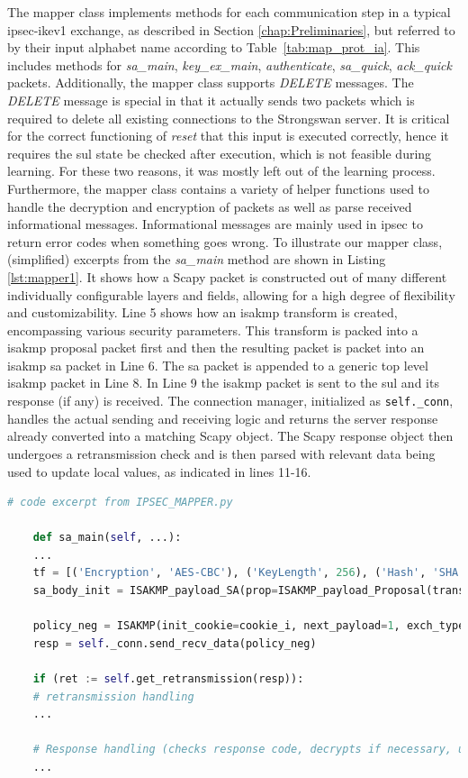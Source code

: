 The mapper class implements methods for each communication step in a typical \ac{ipsec}-\ac{ike}v1 exchange, as described in Section \ref{chap:Preliminaries}, but referred to by their input alphabet name according to Table~\ref{tab:map_prot_ia}. This includes methods for \emph{sa\_main}, \emph{key\_ex\_main}, \emph{authenticate}, \emph{sa\_quick}, \emph{ack\_quick} packets. Additionally, the mapper class supports \emph{DELETE} messages. The \emph{DELETE} message is special in that it actually sends two packets which is required to delete all existing connections to the Strongswan server. It is critical for the correct functioning of \emph{reset} that this input is executed correctly, hence it requires the \ac{sul} state be checked after execution, which is not feasible during learning. For these two reasons, it was mostly left out of the learning process. Furthermore, the mapper class contains a variety of helper functions used to handle the decryption and encryption of packets as well as parse received informational messages. Informational messages are mainly used in \ac{ipsec} to return error codes when something goes wrong. To illustrate our mapper class, (simplified) excerpts from the \emph{sa\_main} method are shown in Listing \ref{lst:mapper1}. It shows how a Scapy packet is constructed out of many different individually configurable layers and fields, allowing for a high degree of flexibility and customizability. Line 5 shows how an \ac{isakmp} transform is created, encompassing various security parameters. This transform is packed into a \ac{isakmp} proposal packet first and then the resulting packet is packet into an \ac{isakmp} \ac{sa} packet in Line 6. The \ac{sa} packet is appended to a generic top level \ac{isakmp} packet in Line 8. In Line 9 the \ac{isakmp} packet is sent to the \ac{sul} and its response (if any) is received. The connection manager, initialized as \texttt{self.\_conn}, handles the actual sending and receiving logic and returns the server response already converted into a matching Scapy object. The Scapy response object then undergoes a retransmission check and is then parsed with relevant data being used to update local values, as indicated in lines 11-16.

\begin{lstlisting}[float=h, caption=Excerpt of sa\_main method code, label=lst:mapper1, language=python]
	# code excerpt from IPSEC_MAPPER.py
	
	def sa_main(self, ...):
	...
	tf = [('Encryption', 'AES-CBC'), ('KeyLength', 256), ('Hash', 'SHA'), ('GroupDesc', '1024MODPgr'), ('Authentication', 'PSK'), ('LifeDuration', 28800)]
	sa_body_init = ISAKMP_payload_SA(prop=ISAKMP_payload_Proposal(trans_nb=1, trans=ISAKMP_payload_Transform(num=1, transforms=tf)))
	
	policy_neg = ISAKMP(init_cookie=cookie_i, next_payload=1, exch_type=2)/sa_body_init
	resp = self._conn.send_recv_data(policy_neg)
	
	if (ret := self.get_retransmission(resp)): 
	# retransmission handling
	...
	
	# Response handling (checks response code, decrypts if necessary, updates relevant local values)
	...
\end{lstlisting}

